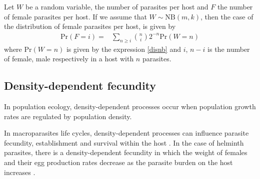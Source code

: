 \documentclass[12pt,a4paper]{article}
\theoremstyle{plain}%
\theoremstyle{definition}
\theoremstyle{remark}
\begin{document}
Let $W$ be a random variable, the number of parasites per host %
and $F$ the number of female parasites per host.
If we assume that $W\sim \mathrm{NB}(m,k)$, then the case of the distribution of female parasites per host, is given by
\begin{equation}\label{genf}
\begin{split}
\mathrm{Pr}(F=i)=&\sum_{n\geq i} \binom{n}{i}
2^{-n}\mathrm{Pr}(W=n)
\end{split}
\end{equation}
where $\mathrm{Pr}(W=n)$ is given by the expression \eqref{disnb} and $i$, $n-i$ is the number of female, male respectively in a host with $n$ parasites.














\subsection{Density-dependent fecundity}
In population ecology, density-dependent processes
occur when population growth rates are regulated by population density.

In macroparasites life cycles, density-dependent processes can influence parasite fecundity, establishment and survival within the host . 
In the case of helminth parasites, there is a density-dependent fecundity in which the weight of females and their egg production rates decrease as the parasite burden on the host increases \cite{churcher2006density,walker2009density}.
\end{document}
